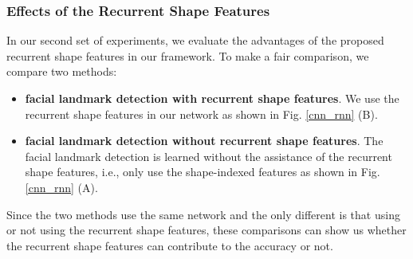 \documentclass[journal]{IEEEtran}
\begin{document}

\subsubsection{Effects of the Recurrent Shape Features}
In our second set of experiments, we evaluate the advantages of the proposed recurrent shape features in our framework. To make a fair comparison, we compare two methods:
\begin{itemize}
\item \textbf{facial landmark detection with recurrent shape features}. We use the recurrent shape features in our network as shown in Fig.  \ref{cnn_rnn} (B).

\item \textbf{facial landmark detection without recurrent shape features}. The facial landmark detection is learned without the assistance of the recurrent shape features, i.e., only use the shape-indexed features as shown in Fig. \ref{cnn_rnn} (A).
\end{itemize}

Since the two methods use the same network and the only different is that using or not using the recurrent shape features, these comparisons can show us whether the recurrent shape features can contribute to the accuracy or not.
\end{document}
